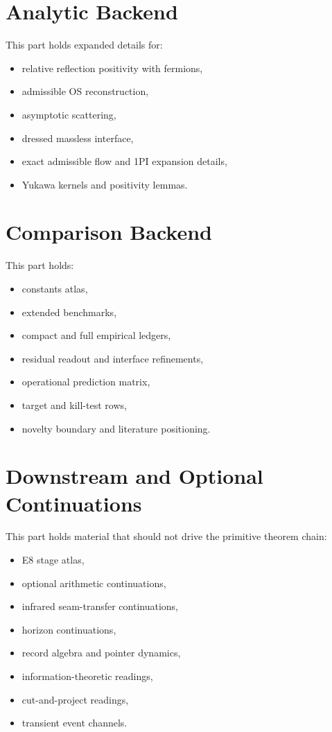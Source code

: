 \documentclass[11pt,a4paper]{article}
\begin{document}
\section{Analytic Backend}

This part holds expanded details for:
\begin{itemize}[leftmargin=1.5em]
    \item relative reflection positivity with fermions,
    \item admissible OS reconstruction,
    \item asymptotic scattering,
    \item dressed massless interface,
    \item exact admissible flow and 1PI expansion details,
    \item Yukawa kernels and positivity lemmas.
\end{itemize}

\section{Comparison Backend}

This part holds:
\begin{itemize}[leftmargin=1.5em]
    \item constants atlas,
    \item extended benchmarks,
    \item compact and full empirical ledgers,
    \item residual readout and interface refinements,
    \item operational prediction matrix,
    \item target and kill-test rows,
    \item novelty boundary and literature positioning.
\end{itemize}

\section{Downstream and Optional Continuations}

This part holds material that should not drive the primitive theorem chain:
\begin{itemize}[leftmargin=1.5em]
    \item E8 stage atlas,
    \item optional arithmetic continuations,
    \item infrared seam-transfer continuations,
    \item horizon continuations,
    \item record algebra and pointer dynamics,
    \item information-theoretic readings,
    \item cut-and-project readings,
    \item transient event channels.
\end{itemize}
\end{document}
